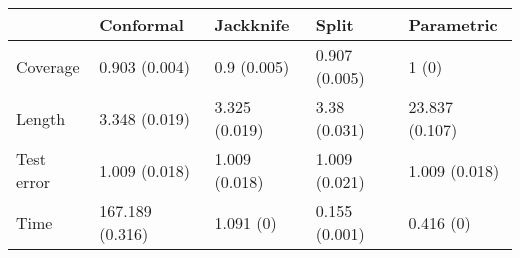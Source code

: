 \begin{tabular}{|l|l|l|l|l|}
\hline
& Conformal & Jackknife & Split & Parametric \\
\hline
Coverage & 0.903 (0.004) & 0.9 (0.005) & 0.907 (0.005) & 1 (0) \\
\hline
Length & 3.348 (0.019) & 3.325 (0.019) & 3.38 (0.031) & 23.837 (0.107) \\
\hline
Test error & 1.009 (0.018) & 1.009 (0.018) & 1.009 (0.021) & 1.009 (0.018) \\
\hline
Time & 167.189 (0.316) & 1.091 (0) & 0.155 (0.001) & 0.416 (0) \\
\hline
\end{tabular}
